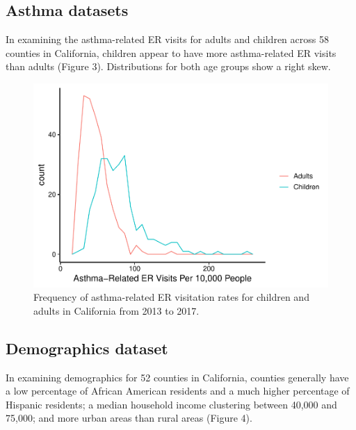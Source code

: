 \documentclass[12pt,]{article}
\begin{document}
\newpage

\hypertarget{asthma-datasets-1}{%
\subsection{Asthma datasets}\label{asthma-datasets-1}}

In examining the asthma-related ER visits for adults and children across
58 counties in California, children appear to have more asthma-related
ER visits than adults (Figure 3). Distributions for both age groups show
a right skew.

\begin{figure}
\centering
\includegraphics{FinalProject_AliciaZhao_files/figure-latex/unnamed-chunk-12-1.pdf}
\caption{Frequency of asthma-related ER visitation rates for children
and adults in California from 2013 to 2017.}
\end{figure}

\newpage

\hypertarget{demographics-dataset-1}{%
\subsection{Demographics dataset}\label{demographics-dataset-1}}

In examining demographics for 52 counties in California, counties
generally have a low percentage of African American residents and a much
higher percentage of Hispanic residents; a median household income
clustering between 40,000 and 75,000; and more urban areas than rural
areas (Figure 4).
\end{document}
